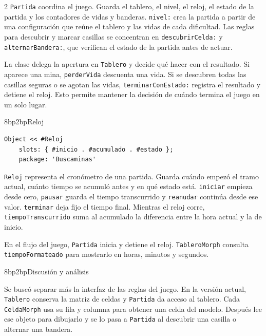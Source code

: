 \documentclass[a4paper,10pt]{article}
\makeatletter
\renewcommand{\subsection}{\@startsection{subsection}{2}{0pt}
  {8bp}{2bp}{\normalfont\fontsize{10bp}{12bp}\selectfont\bfseries}}
\renewcommand{\subsubsection}{\@startsection{subsubsection}{3}{0pt}
  {8bp}{2bp}{\normalfont\fontsize{10bp}{12bp}\selectfont\bfseries}}
\makeatother
\begin{document}
\begin{multicols}{2}
\texttt{Partida} coordina el juego. Guarda el tablero, el nivel, el reloj, el estado de la partida y los contadores de vidas y banderas. \texttt{nivel:} crea la partida a partir de una configuración que reúne el tablero y las vidas de cada dificultad. Las reglas para descubrir y marcar casillas se concentran en \texttt{descubrirCelda:} y \texttt{alternarBandera:}, que verifican el estado de la partida antes de actuar.

La clase delega la apertura en \texttt{Tablero} y decide qué hacer con el resultado. Si aparece una mina, \texttt{perderVida} descuenta una vida. Si se descubren todas las casillas seguras o se agotan las vidas, \texttt{terminarConEstado:} registra el resultado y detiene el reloj. Esto permite mantener la decisión de cuándo termina el juego en un solo lugar.

\begin{samepage}
\subsubsection{Reloj}
\begingroup
\fontsize{8.5bp}{10.5bp}\selectfont
\setlength{\topsep}{3bp}
\setlength{\partopsep}{0pt}
\begin{verbatim}
Object << #Reloj
    slots: { #inicio . #acumulado . #estado };
    package: 'Buscaminas'
\end{verbatim}
\endgroup
\end{samepage}

\texttt{Reloj} representa el cronómetro de una partida. Guarda cuándo empezó el tramo actual, cuánto tiempo se acumuló antes y en qué estado está. \texttt{iniciar} empieza desde cero, \texttt{pausar} guarda el tiempo transcurrido y \texttt{reanudar} continúa desde ese valor. \texttt{terminar} deja fijo el tiempo final. Mientras el reloj corre, \texttt{tiempoTranscurrido} suma al acumulado la diferencia entre la hora actual y la de inicio.

En el flujo del juego, \texttt{Partida} inicia y detiene el reloj. \texttt{TableroMorph} consulta \texttt{tiempoFormateado} para mostrarlo en horas, minutos y segundos.

\subsection{Discusión y análisis}

Se buscó separar más la interfaz de las reglas del juego. En la versión actual, \texttt{Tablero} conserva la matriz de celdas y \texttt{Partida} da acceso al tablero. Cada \texttt{CeldaMorph} usa su fila y columna para obtener una celda del modelo. Después lee ese objeto para dibujarlo y se lo pasa a \texttt{Partida} al descubrir una casilla o alternar una bandera.


\end{multicols}
\end{document}
